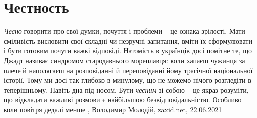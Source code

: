 
 
 
 
 
\chapter{Честность}
\label{sec:slova.chestnost}

\emph{Чесно} говорити про свої думки, почуття і проблеми – це ознака зрілості. Мати
сміливість висловити свої складні чи незручні запитання, вміти їх сформулювати
і бути готовим почути важкі відповіді. Натомість в українців досі помітне те,
що Джадт називає синдромом стародавнього мореплавця: коли хапаєш чужинця за
плече й наполягаєш на розповіданні й переповіданні йому трагічної національної
історії.  Тому ми досі так глибоко в минулому, що не можемо нічого розгледіти в
теперішньому. Навіть дна під носом. Бути \emph{чесним} зі собою – це якраз розуміти,
що відкладати важливі розмови є найбільшою безвідповідальністю. Особливо коли
повітря дедалі менше
, 
Володимир Молодій, zaxid.net, 22.06.2021

